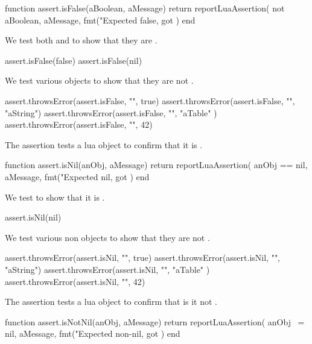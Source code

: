 \startLuaCode
function assert.isFalse(aBoolean, aMessage)
  return reportLuaAssertion(
    not aBoolean,
    aMessage,
    fmt("Expected false, got %
  )
end
\stopLuaCode


We test both  and  to show that they are 
. 

\startLuaTest
  assert.isFalse(false)
  assert.isFalse(nil)
\stopLuaTest
\stopTestCase


We test various objects to show that they are not .

\startLuaTest
  assert.throwsError(assert.isFalse, "", true)
  assert.throwsError(assert.isFalse, "", "aString")
  assert.throwsError(assert.isFalse, "", { "aTable" })
  assert.throwsError(assert.isFalse, "", 42)
\stopLuaTest
\stopTestCase

\stopTestSuite


The  assertion tests a lua object to confirm that it is 
. 

\startLuaCode
function assert.isNil(anObj, aMessage)
  return reportLuaAssertion(
    anObj == nil,
    aMessage,
    fmt("Expected nil, got %
  )
end
\stopLuaCode


We test  to show that it is . 

\startLuaTest
  assert.isNil(nil)
\stopLuaTest
\stopTestCase


We test various non  objects to show that they are not 
. 

\startLuaTest
  assert.throwsError(assert.isNil, "", true)
  assert.throwsError(assert.isNil, "", "aString")
  assert.throwsError(assert.isNil, "", { "aTable" })
  assert.throwsError(assert.isNil, "", 42)
\stopLuaTest
\stopTestCase

\stopTestSuite


The  assertion tests a lua object to confirm that is 
it not . 

\startLuaCode
function assert.isNotNil(anObj, aMessage)
  return reportLuaAssertion(
    anObj ~= nil,
    aMessage,
    fmt("Expected non-nil, got %
  )
end
\stopLuaCode

